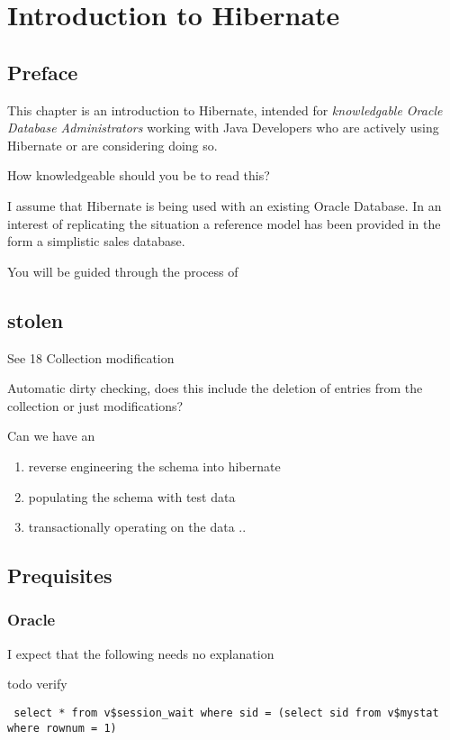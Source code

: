 \chapter{Introduction to Hibernate}
\section{Preface}
This chapter is an introduction to Hibernate, intended for \textit{knowledgable Oracle Database Administrators} working with Java Developers 
who are actively using Hibernate or are considering doing so.

How knowledgeable should you be to read this?

I assume that Hibernate is being used with an existing Oracle Database.  In an interest of replicating the situation a reference model
has been provided in the form a simplistic sales database. 

You will be guided through the process of 

\section{stolen}
See 18 Collection modification

Automatic dirty checking, does this include the deletion of entries from the collection or just modifications?

Can we have an 

\begin{enumerate}
 \item reverse engineering the schema into hibernate 
 \item populating the schema with test data
 \item transactionally operating on the data
..
\end{enumerate}


\section{Prequisites}
\subsection{Oracle}

I expect that the following needs no explanation

todo verify
\begin{verbatim}
 select * from v$session_wait where sid = (select sid from v$mystat where rownum = 1)
\end{verbatim}




